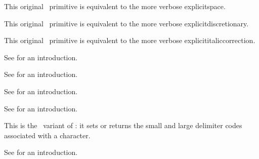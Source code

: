 \stopsection


\startsection[title=Primitives]

\startoldprimitive[title={\prm {<space>}}]

This original \TEX\ primitive is equivalent to the more verbose \prm
{explicitspace}.

\stopoldprimitive

\startoldprimitive[title={\prm {-}}]

This original \TEX\ primitive is equivalent to the more verbose \prm
{explicitdiscretionary}.

\stopoldprimitive

\startoldprimitive[title={\prm {/}}]

This original \TEX\ primitive is equivalent to the more verbose \prm
{explicititaliccorrection}.

\stopoldprimitive

\startnewprimitive[title={\prm {Uabove}}]

See  for an introduction.

\stopnewprimitive

\startnewprimitive[title={\prm {Uabovewithdelims}}]

See  for an introduction.

\stopnewprimitive

\startnewprimitive[title={\prm {Uatop}}]

See  for an introduction.

\stopnewprimitive

\startnewprimitive[title={\prm {Uatopwithdelims}}]

See  for an introduction.

\stopnewprimitive

\startnewprimitive[title={\prm {Udelcode}}]

This is the \UNICODE\ variant of : it sets or returns the small and
large delimiter codes associated with a character.

\stopnewprimitive

\startnewprimitive[title={\prm {Udelimited}}]

See  for an introduction.

\stopnewprimitive

